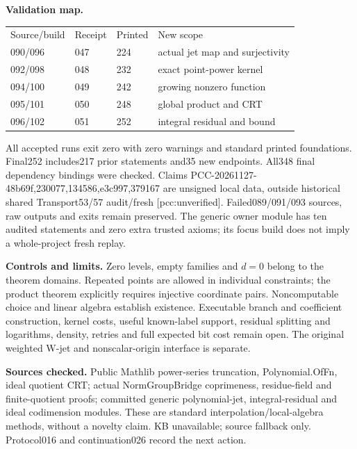 \documentclass[11pt]{article}
\begin{document}
\textbf{Validation map.}
\begin{center}\begin{tabular}{llll}
Source/build&Receipt&Printed&New scope\\
090/096&047&224&actual jet map and surjectivity\\
092/098&048&232&exact point-power kernel\\
094/100&049&242&growing nonzero function\\
095/101&050&248&global product and CRT\\
096/102&051&252&integral residual and bound
\end{tabular}\end{center}
All accepted runs exit zero with zero warnings and standard printed
foundations. Final252 includes217 prior statements and35 new endpoints.
All348 final dependency bindings were checked. Claims
PCC-20261127-48b69f,230077,134586,e3c997,379167 are unsigned local data,
outside historical shared Transport53/57 audit/fresh [pcc:unverified].
Failed089/091/093 sources, raw outputs and exits remain preserved.
The generic owner module has ten audited statements and zero extra trusted
axioms; its focus build does not imply a whole-project fresh replay.

\textbf{Controls and limits.}
Zero levels, empty families and \(d=0\) belong to the theorem domains.
Repeated points are allowed in individual constraints; the product theorem
explicitly requires injective coordinate pairs. Noncomputable choice and
linear algebra establish existence. Executable branch and coefficient
construction, kernel costs, useful known-label support, residual splitting
and logarithms, density, retries and full expected bit cost remain open.
The original weighted W-jet and nonscalar-origin interface is separate.

\textbf{Sources checked.}
Public Mathlib power-series truncation, Polynomial.OfFn, ideal quotient CRT;
actual NormGroupBridge coprimeness, residue-field and finite-quotient
proofs; committed generic polynomial-jet, integral-residual and ideal
codimension modules. These are standard
interpolation/local-algebra methods, without a novelty claim. KB unavailable;
source fallback only. Protocol016 and continuation026 record the next action.
\end{document}
